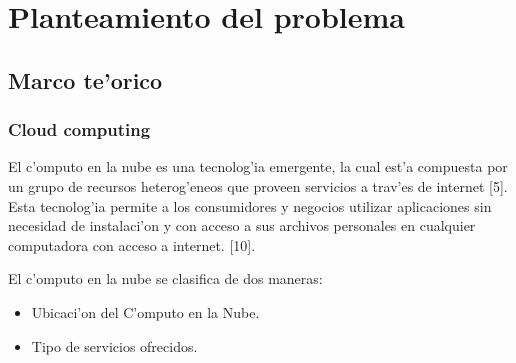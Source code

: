
\chapter*{Planteamiento del problema}

\section*{Marco te'orico}


\subsection*{Cloud computing}


El c'omputo en la nube es una tecnolog'ia emergente, la cual est'a compuesta por un grupo de recursos heterog'eneos que proveen servicios a trav'es de internet [5].
Esta tecnolog'ia permite a los consumidores y negocios utilizar aplicaciones sin necesidad de instalaci'on y con acceso a sus archivos personales en cualquier computadora con acceso a internet. [10].

El c'omputo en la nube se clasifica  de dos maneras:
\begin{itemize}
\item Ubicaci'on del C'omputo en la Nube.
\item Tipo de servicios ofrecidos.
\end{itemize}

